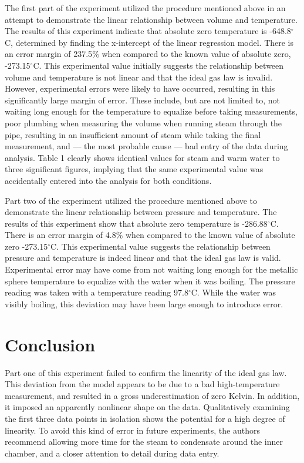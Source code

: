 \documentclass[%
 aip,
 jmp,%
 amsmath,amssymb,
 reprint,%
]{revtex4-1}
\begin{document}
	The first part of the experiment utilized the procedure mentioned above in an attempt to demonstrate the linear relationship between volume and temperature. The results of this experiment indicate that absolute zero temperature is -648.8$^{\circ}$C, determined by finding the x-intercept of the linear regression model. There is an error margin of 237.5$\%$ when compared to the known value of absolute zero, -273.15$^{\circ}$C. This experimental value initially suggests the relationship between volume and temperature is not linear and that the ideal gas law is invalid. However, experimental errors were likely to have occurred, resulting in this significantly large margin of error. These include, but are not limited to, not waiting long enough for the temperature to equalize before taking measurements, poor plumbing when measuring the volume when running steam through the pipe, resulting in an insufficient amount of steam while taking the final measurement, and --- the most probable cause --- bad entry of the data during analysis. Table 1 clearly shows identical values for steam and warm water to three significant figures, implying that the same experimental value was accidentally entered into the analysis for both conditions.

	Part two of the experiment utilized the procedure mentioned above to demonstrate the linear relationship between pressure and temperature. The results of this experiment show that absolute zero temperature is -286.88$^{\circ}$C. There is an error margin of 4.8$\%$ when compared to the known value of absolute zero -273.15$^{\circ}$C. This experimental value suggests the relationship between pressure and temperature is indeed linear and that the ideal gas law is valid. Experimental error may have come from not waiting long enough for the metallic sphere temperature to equalize with the water when it was boiling. The pressure reading was taken with a temperature reading 97.8$^{\circ}$C. While the water was visibly boiling, this deviation may have been large enough to introduce error.

  \section{Conclusion}

  Part one of this experiment failed to confirm the linearity of the ideal gas law. This deviation from the model appears to be due to a bad high-temperature measurement, and resulted in a gross underestimation of zero Kelvin. In addition, it imposed an apparently nonlinear shape on the data. Qualitatively examining the first three data points in isolation shows the potential for a high degree of linearity. To avoid this kind of error in future experiments, the authors recommend allowing more time for the steam to condensate around the inner chamber, and a closer attention to detail during data entry.
\end{document}
